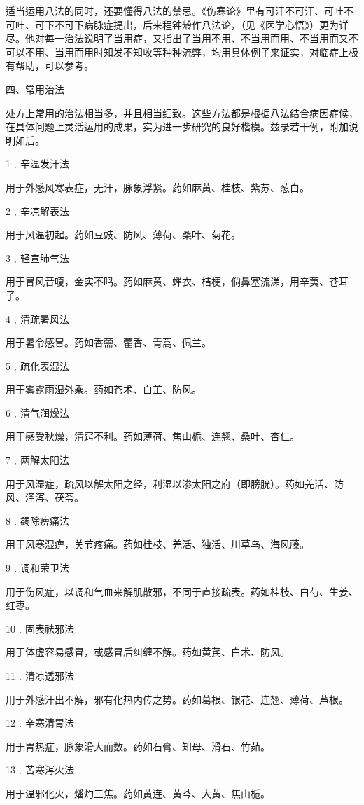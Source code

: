 \documentclass[12pt,UTF8]{ctexbook}
\begin{document}
适当运用八法的同时，还要懂得八法的禁忌。《伤寒论》里有可汗不可汗、可吐不可吐、可下不可下病脉症提出，后来程钟龄作八法论，（见《医学心悟》）更为详尽。他对每一治法说明了当用症，又指出了当用不用、不当用而用、不当用而又不可以不用、当用而用时知发不知收等种种流弊，均用具体例子来证实，对临症上极有帮助，可以参考。

四、常用治法

处方上常用的治法相当多，并且相当细致。这些方法都是根据八法结合病因症候，在具体问题上灵活运用的成果，实为进一步研究的良好楷模。兹录若干例，附加说明如后。

1﹒辛温发汗法

用于外感风寒表症，无汗，脉象浮紧。药如麻黄、桂枝、紫苏、葱白。

2﹒辛凉解表法

用于风温初起。药如豆豉、防风、薄荷、桑叶、菊花。

3﹒轻宣肺气法

用于冒风音嗄，金实不鸣。药如麻黄、蝉衣、桔梗，倘鼻塞流涕，用辛荑、苍耳子。

4﹒清疏暑风法

用于暑令感冒。药如香薷、藿香、青蒿、佩兰。

5﹒疏化表湿法

用于雾露雨湿外乘。药如苍术、白芷、防风。

6﹒清气润燥法

用于感受秋燥，清窍不利。药如薄荷、焦山栀、连翘、桑叶、杏仁。

7﹒两解太阳法

用于风湿症，疏风以解太阳之经，利湿以渗太阳之府（即膀胱）。药如羌活、防风、泽泻、茯苓。

8﹒蠲除痹痛法

用于风寒湿痹，关节疼痛。药如桂枝、羌活、独活、川草乌、海风藤。

9﹒调和荣卫法

用于伤风症，以调和气血来解肌散邪，不同于直接疏表。药如桂枝、白芍、生姜、红枣。

10﹒固表祛邪法

用于体虚容易感冒，或感冒后纠缠不解。药如黄芪、白术、防风。

11﹒清凉透邪法

用于外感汗出不解，邪有化热内传之势。药如葛根、银花、连翘、薄荷、芦根。

12﹒辛寒清胃法

用于胃热症，脉象滑大而数。药如石膏、知母、滑石、竹茹。

13﹒苦寒泻火法

用于温邪化火，燔灼三焦。药如黄连、黄芩、大黄、焦山栀。
\end{document}
